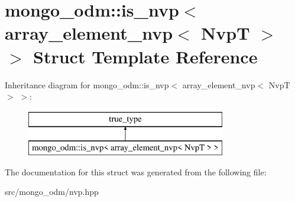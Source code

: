 \hypertarget{structmongo__odm_1_1is__nvp_3_01array__element__nvp_3_01NvpT_01_4_01_4}{}\section{mongo\+\_\+odm\+:\+:is\+\_\+nvp$<$ array\+\_\+element\+\_\+nvp$<$ NvpT $>$ $>$ Struct Template Reference}
\label{structmongo__odm_1_1is__nvp_3_01array__element__nvp_3_01NvpT_01_4_01_4}
Inheritance diagram for mongo\+\_\+odm\+:\+:is\+\_\+nvp$<$ array\+\_\+element\+\_\+nvp$<$ NvpT $>$ $>$\+:\begin{figure}[H]
\begin{center}
\leavevmode
\includegraphics[height=2.000000cm]{structmongo__odm_1_1is__nvp_3_01array__element__nvp_3_01NvpT_01_4_01_4}
\end{center}
\end{figure}


The documentation for this struct was generated from the following file\+:\begin{DoxyCompactItemize}
\item 
src/mongo\+\_\+odm/nvp.\+hpp\end{DoxyCompactItemize}
